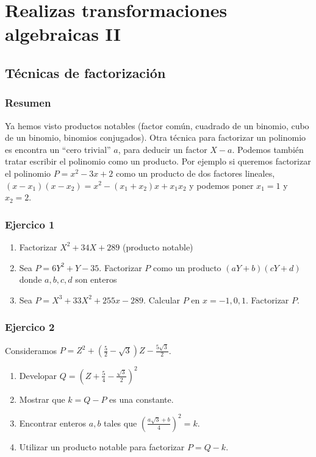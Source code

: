 \chapter{Realizas transformaciones algebraicas II}

\section{Técnicas de factorización}

\subsection*{Resumen}

Ya hemos visto productos notables (factor común, cuadrado de un binomio,
cubo de un binomio, binomios conjugados). Otra técnica para factorizar un
polinomio es encontra un ``cero trivial'' $a$, para deducir un factor
$X - a$. Podemos también tratar escribir el polinomio como un producto. Por
ejemplo si queremos factorizar el polinomio $P = x^2 - 3x + 2$ como un
producto de dos factores lineales,
${(x - x_1)}{(x-x_2)} = x^2 - {(x_1+x_2)}x + x_1 x_2$ y podemos poner
$x_1 = 1$ y $x_2 = 2$.

\subsection*{Ejercico 1}

\begin{enumerate}
\item Factorizar $X^2 + 34X + 289$ (producto notable)

\item Sea $P = 6 Y^2 + Y -35$. Factorizar $P$ como un producto
  ${(aY + b)}{(cY + d)}$ donde $a, b, c, d$ son enteros

\item Sea $P = X^3+33X^2+255x-289$. Calcular $P$ en $x = -1, 0, 1$. Factorizar
  $P$.
\end{enumerate}

\subsection*{Ejercico 2}

Consideramos $P = Z^2 + \left(\frac{5}{2} - \sqrt{3}\right) Z -
\frac{5 \sqrt{3}}{2}$.

\begin{enumerate}
\item Developar $Q = \left( Z + \frac{5}{4} - \frac{\sqrt{3}}{2} \right)^2$
\item Mostrar que $k = Q - P$ es una constante.
\item Encontrar enteros $a, b$ tales que
  $\left(\frac{a \sqrt{3} + b}{4}\right)^2 = k$.
\item Utilizar un producto notable para factorizar $P = Q - k$.
\end{enumerate}

